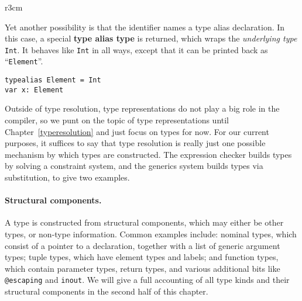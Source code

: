 \documentclass[../generics]{subfiles}
\begin{document}
\medskip

\begin{wrapfigure}[8]{r}{3cm}
\end{wrapfigure}

Yet another possibility is that the identifier names a type alias declaration. In this case, a special \textbf{type alias type} is returned, which wraps the \emph{underlying type} \texttt{Int}. It behaves like \texttt{Int} in all ways, except that it can be printed back as ``\texttt{Element}''.

\medskip
\noindent
\begin{minipage}{29em}
\begin{Verbatim}
typealias Element = Int
var x: Element
\end{Verbatim}
\end{minipage}
\medskip

Outside of type resolution, type representations do not play a big role in the compiler, so we punt on the topic of type representations until Chapter~\ref{typeresolution} and just focus on types for now. For our current purposes, it suffices to say that type resolution is really just one possible mechanism by which types are constructed. The expression checker builds types by solving a constraint system, and the generics system builds types via substitution, to give two examples.

\paragraph{Structural components.} A type is constructed from structural components, which may either be other types, or non-type information. Common examples include: nominal types, which consist of a pointer to a declaration, together with a list of generic argument types; tuple types, which have element types and labels; and function types, which contain parameter types, return types, and various additional bits like \texttt{@escaping} and \texttt{inout}.  We will give a full accounting of all type kinds and their structural components in the second half of this chapter.
\end{document}
